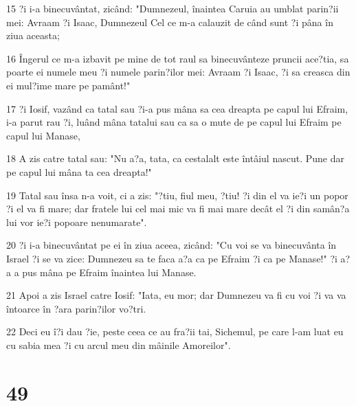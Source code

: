 \par 15 ?i i-a binecuvântat, zicând: "Dumnezeul, înaintea Caruia au umblat parin?ii mei: Avraam ?i Isaac, Dumnezeul Cel ce m-a calauzit de când sunt ?i pâna în ziua aceasta;
\par 16 Îngerul ce m-a izbavit pe mine de tot raul sa binecuvânteze pruncii ace?tia, sa poarte ei numele meu ?i numele parin?ilor mei: Avraam ?i Isaac, ?i sa creasca din ei mul?ime mare pe pamânt!"
\par 17 ?i Iosif, vazând ca tatal sau ?i-a pus mâna sa cea dreapta pe capul lui Efraim, i-a parut rau ?i, luând mâna tatalui sau ca sa o mute de pe capul lui Efraim pe capul lui Manase,
\par 18 A zis catre tatal sau: "Nu a?a, tata, ca cestalalt este întâiul nascut. Pune dar pe capul lui mâna ta cea dreapta!"
\par 19 Tatal sau însa n-a voit, ci a zis: "?tiu, fiul meu, ?tiu! ?i din el va ie?i un popor ?i el va fi mare; dar fratele lui cel mai mic va fi mai mare decât el ?i din samân?a lui vor ie?i popoare nenumarate".
\par 20 ?i i-a binecuvântat pe ei în ziua aceea, zicând: "Cu voi se va binecuvânta în Israel ?i se va zice: Dumnezeu sa te faca a?a ca pe Efraim ?i ca pe Manase!" ?i a?a a pus mâna pe Efraim înaintea lui Manase.
\par 21 Apoi a zis Israel catre Iosif: "Iata, eu mor; dar Dumnezeu va fi cu voi ?i va va întoarce în ?ara parin?ilor vo?tri.
\par 22 Deci eu î?i dau ?ie, peste ceea ce au fra?ii tai, Sichemul, pe care l-am luat eu cu sabia mea ?i cu arcul meu din mâinile Amoreilor".

\chapter{49}

